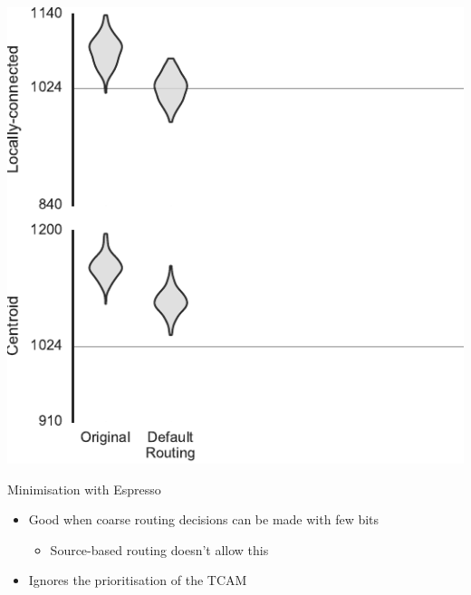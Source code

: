 \documentclass[t]{beamer}
\begin{document}
\begin{frame}[plain]{}
  \begin{center}
    \includegraphics[page=2]{../experiments/presentation_plots}
  \end{center}
\end{frame}

\begin{frame}{Minimisation with Espresso}
  \begin{itemize}
    \item Good when coarse routing decisions can be made with few bits
      \begin{itemize}
        \item Source-based routing doesn't allow this
      \end{itemize}
    \item Ignores the prioritisation of the TCAM
  \end{itemize}
\end{frame}
\end{document}
